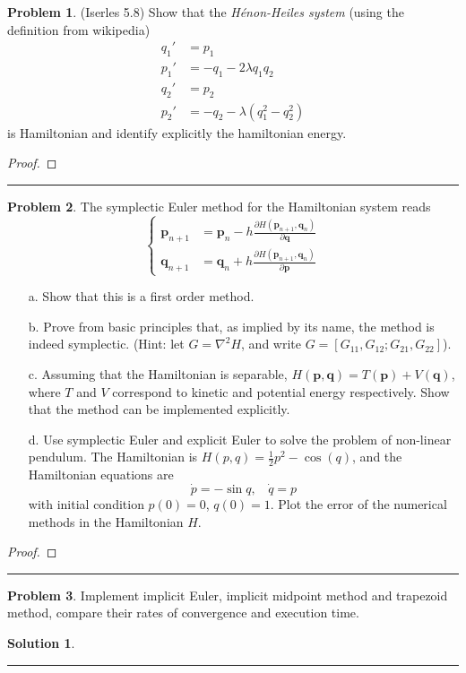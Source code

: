 \documentclass[a4paper, 10pt]{article}
\theoremstyle{definition}
\newtheorem{problem}{Problem}
\theoremstyle{hSol}
\newtheorem*{solution}{Solution}
\begin{document}
\begin{problem} (Iserles 5.8) Show that the \emph{H\'enon-Heiles system} (using the definition from wikipedia)
\begin{equation}
  \begin{split}
    q_1' &= p_1 \\
    p_1' &= -q_1 - 2 \lambda q_1 q_2\\
    q_2' &= p_2 \\
    p_2' &= -q_2 - \lambda (q_1^2 - q_2^2)
  \end{split}
\end{equation}
is Hamiltonian and identify explicitly the hamiltonian energy.
\end{problem}
\begin{proof} 

\end{proof} 
\noindent\rule{16cm}{0.4pt}

\begin{problem} The symplectic Euler method for the Hamiltonian system reads
\begin{equation}
\begin{cases}
  \bm{p}_{n+1} &= \bm{p}_n - h \frac{\partial H(\bm{p}_{n+1}, \bm{q}_n)}{\partial \bm{q}} \\
  \bm{q}_{n+1} &= \bm{q}_n + h \frac{\partial H(\bm{p}_{n+1}, \bm{q}_n)}{\partial \bm{p}}
\end{cases}
\end{equation}
\begin{itemize}
  \item[a.] Show that this is a first order method.
  \item[b.] Prove from basic principles that, as implied by its name, the method is indeed symplectic. (Hint: let $G=\nabla^2 H$, and write $G=[G_{11}, G_{12}; G_{21}, G_{22}]$).
  \item[c.] Assuming that the Hamiltonian is separable, $H(\bm{p}, \bm{q})=T(\bm{p})+V(\bm{q})$, where $T$ and $V$ correspond to kinetic and potential energy respectively. Show that the method can be implemented explicitly.
  \item[d.] Use symplectic Euler and explicit Euler to solve the problem of non-linear pendulum. The Hamiltonian is $H(p,q)=\frac{1}{2}p^2 - \cos({q})$, and the Hamiltonian equations are
  $$
  \dot{p} = -\sin q,~~~~\dot{q} = p
  $$
  with initial condition $p(0)=0$, $q(0)=1$. Plot the error of the numerical methods in the Hamiltonian $H$.
\end{itemize}
\end{problem}
\begin{proof} 

\end{proof} 
\noindent\rule{16cm}{0.4pt}

\begin{problem} Implement implicit Euler, implicit midpoint method and trapezoid method, compare their rates of convergence and execution time. 

\end{problem}
\begin{solution} 

\end{solution} 
\noindent\rule{16cm}{0.4pt}
\end{document}
